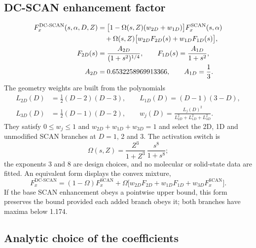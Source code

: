 \documentclass[journal=jctcce,manuscript=article]{achemso}
\begin{document}
\subsection{DC-SCAN enhancement factor}
\begin{align}
F_x^{\mathrm{DC\text{-}SCAN}}(s,\alpha,D,Z)&=\bigl[1-\Omega(s,Z)(w_{2D}+w_{1D})\bigr]F_x^{\mathrm{SCAN}}(s,\alpha)
\notag\\&\quad+\Omega(s,Z)\bigl[w_{2D}F_{2D}(s)+w_{1D}F_{1D}(s)\bigr],
\label{eq:dc-Fx}\\
F_{2D}(s)&=\frac{A_{2D}}{(1+s^2)^{1/4}},\qquad F_{1D}(s)=\frac{A_{1D}}{1+s^2},
\label{eq:dc-branches}\\
A_{2D}&=0.6532258969913366,\qquad A_{1D}=\frac13.
\label{eq:dc-A}
\end{align}
The geometry weights are built from the polynomials
\begin{align}
L_{2D}(D)&=\tfrac12(D-2)(D-3),\qquad L_{1D}(D)=(D-1)(3-D),
\label{eq:dc-L}\\
L_{3D}(D)&=\tfrac12(D-1)(D-2),\qquad
w_j(D)=\frac{L_j(D)^2}{L_{2D}^2+L_{1D}^2+L_{3D}^2}.
\label{eq:dc-w}
\end{align}
They satisfy $0\le w_j\le1$ and $w_{2D}+w_{1D}+w_{3D}=1$ and select the 2D, 1D
and unmodified SCAN branches at $D=1$, 2 and 3.  The activation switch is
\begin{equation}
\Omega(s,Z)=\frac{Z^3}{1+Z^3}\,\frac{s^8}{1+s^8};
\label{eq:dc-Omega}
\end{equation}
the exponents 3 and 8 are design choices, and no molecular or solid-state
data are fitted.  An equivalent form displays the convex mixture,
\begin{equation}
F_x^{\mathrm{DC\text{-}SCAN}}=(1-\Omega)F_x^{\mathrm{SCAN}}
+\Omega\bigl[w_{2D}F_{2D}+w_{1D}F_{1D}+w_{3D}F_x^{\mathrm{SCAN}}\bigr].
\label{eq:dc-convex}
\end{equation}
If the base SCAN enhancement obeys a pointwise upper bound, this form
preserves the bound provided each added branch obeys it; both branches have
maxima below 1.174.

\subsection{Analytic choice of the coefficients}
\end{document}
